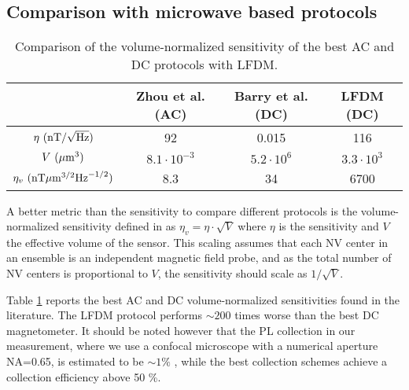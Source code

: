 \documentclass[a4paper, 11pt]{report}
\begin{document}
\subsection{Comparison with microwave based protocols}

\begin{table}[htbp]
\centering
\caption{Comparison of the volume-normalized sensitivity of the best AC and DC protocols with LFDM.}
 \label{table sensi volumiques}
\begin{tabular}{c|ccc}
\toprule
{} & Zhou et al. \citep{zhou2020quantum} (AC) & Barry et al.\citep{barry2016optical} (DC) & LFDM (DC) \\
\midrule
$\eta\ (\rm{nT} / \sqrt{\rm Hz})$ & 92&0.015& 116 \\
$V\ (\mu \rm{m}^3)$ &$8.1 \cdot 10^{-3}$ &$5.2 \cdot 10^{6}$& $3.3 \cdot 10^{3}$ \\
$\eta_v\ (\rm{nT}\mu \rm{m}^{3/2} \rm{Hz}^{-1/2})$ &8.3&34&6700 \\
\bottomrule
\end{tabular}
\end{table}

A better metric than the sensitivity to compare different protocols is the volume-normalized sensitivity defined in \citep{zhou2020quantum} as $\eta_v=\eta\cdot \sqrt{V}$ where $\eta$ is the sensitivity and $V$ the effective volume of the sensor. This scaling assumes that each NV center in an ensemble is an independent magnetic field probe, and as the total number of NV centers is proportional to $V$, the sensitivity should scale as $1/\sqrt{V}$.

Table \ref{table sensi volumiques} reports the best AC and DC volume-normalized sensitivities found in the literature. The LFDM protocol performs $\sim 200$ times worse than the best DC magnetometer. It should be noted however that the PL collection in our measurement, where we use a confocal microscope with a numerical aperture NA=0.65, is estimated to be $\sim 1 \%$ \citep{le2012efficient}, while the best collection schemes \citep{le2012efficient,wolf2015subpicotesla,wang2022picotesla, alsid2022solid} achieve a collection efficiency above 50 \%.
\end{document}

